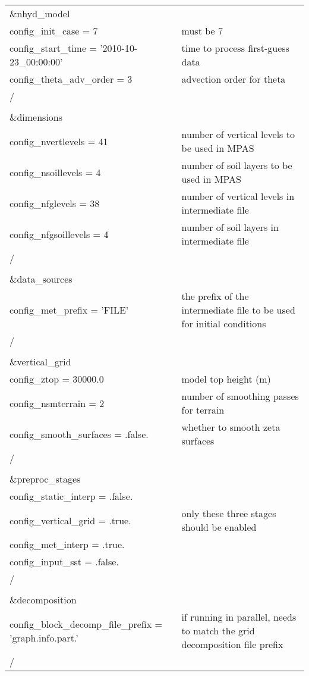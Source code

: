 \begin{longtable}{p{3.0in} |p{3.25in}}

\&nhyd\_model\\
   config\_init\_case       = 7                      & must be 7 \\
   config\_start\_time      = '2010-10-23\_00:00:00' & time to process first-guess data \\
   config\_theta\_adv\_order = 3                     & advection order for theta \\
/\\
\\
\&dimensions\\
   config\_nvertlevels     = 41                      & number of vertical levels to be used in MPAS \\
   config\_nsoillevels     = 4                       & number of soil layers to be used in MPAS \\
   config\_nfglevels       = 38                      & number of vertical levels in intermediate file \\
   config\_nfgsoillevels   = 4                       & number of soil layers in intermediate file \\
/\\
\\
\&data\_sources\\
   config\_met\_prefix      = 'FILE'                 & the prefix of the intermediate file to be used for initial conditions \\
/\\
\\
\&vertical\_grid\\
   config\_ztop            = 30000.0                 & model top height (m) \\
   config\_nsmterrain      = 2                       & number of smoothing passes for terrain \\
   config\_smooth\_surfaces = .false.                 & whether to smooth zeta surfaces \\
/\\
\\
\&preproc\_stages                                    & \\
   config\_static\_interp   = .false.                & \\
   config\_vertical\_grid   = .true.                 & only these three stages should be enabled \\
   config\_met\_interp      = .true.                 & \\
   config\_input\_sst       = .false.                & \\
/\\
\\
\&decomposition\\
   config\_block\_decomp\_file\_prefix = 'graph.info.part.' & if running in parallel, needs to match the grid decomposition file prefix \\
/\\
\end{longtable}

